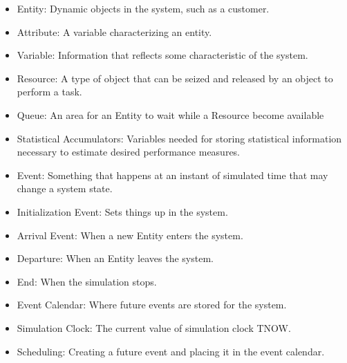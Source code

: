 \documentclass[12pt]{article}
\begin{document}
\begin{itemize}
\item Entity: Dynamic objects in the system, such as a customer. 

\item Attribute: A variable characterizing an entity. 

\item Variable: Information that reflects some characteristic of the system. 

\item Resource: A type of object that can be seized and released by an object to perform a task.

\item Queue: An area for an Entity to wait while a Resource become available

\item Statistical Accumulators: Variables needed for storing statistical information necessary to estimate desired performance measures. 

\item Event: Something that happens at an instant of simulated time that may change a system state. 

\item Initialization Event: Sets things up in the system.

\item Arrival Event: When a new Entity enters the system.

\item Departure: When an Entity leaves the system.

\item End: When the simulation stops.

\item Event Calendar: Where future events are stored for the system. 

\item Simulation Clock: The current value of simulation clock TNOW.

\item Scheduling: Creating a future event and placing it in the event calendar. 

\end{itemize}
\end{document}
